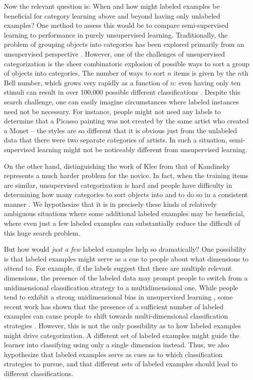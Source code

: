\documentclass[a4paper, doc]{apa6}
\begin{document}
Now the relevant question is: When and how might labeled examples be beneficial for category learning above and beyond having only unlabeled examples? One method to assess this would be to compare semi-supervised learning to performance in purely unsupervised learning. Traditionally, the problem of grouping objects into categories has been explored primarily from an unsupervised perspective \cite{medin1987constraints, pothos2008one, pothos2011measuring}. However, one of the challenges of unsupervised categorization is the sheer combinatoric explosion of possible ways to sort a group of objects into categories. The number of ways to sort $n$ items is given by the $n$th Bell number, which grows very rapidly as a function of $n$: even having only ten stimuli can result in over 100,000 possible different classifications \cite{medin1997cognitive}. Despite this search challenge, one can easily imagine circumstances where labeled instances need not be necessary. For instance, people might not need any labels to determine that a Picasso painting was not created by the same artist who created a Monet -- the styles are so different that it is obvious just from the unlabeled data that there were two separate categories of artists. In such a situation, semi-supervised learning might not be noticeably different from unsupervised learning.

On the other hand, distinguishing the work of Klee from that of Kandinsky represents a much harder problem for the novice. In fact, when the training items are similar, unsupervised categorization is hard and people have difficulty in determining how many categories to sort objects into and to do so in a consistent manner \cite{pothos2011measuring}. We hypothesize that it is in precisely these kinds of relatively ambiguous situations where some additional labeled examples may be beneficial, where even just a few labeled examples can substantially reduce the difficult of this huge search problem.

But how would {\it just a few} labeled examples help so dramatically? One possibility is that labeled examples might serve as a cue to people about what dimensions to attend to. For example, if the labels suggest that there are multiple relevant dimensions, the presence of the labeled data may prompt people to switch from a unidimensional classification strategy to a multidimensional one. While people tend to exhibit a strong unidimensional bias in unsupervised learning \cite{ashby1999dominance, medin1987constraints}, some recent work has shown that the presence of a sufficient number of labeled examples can cause people to shift towards multi-dimensional classification strategies \cite{vandist2009semisupervised, mcdonnell2012sparse}. However, this is not the only possibility as to how labeled examples might drive categorization. A different set of labeled examples might guide the learner into classifying using only a single dimension instead. Thus, we also hypothesize that labeled examples serve as cues as to which classification strategies to pursue, and that different sets of labeled examples should lead to different classifications.
\end{document}
